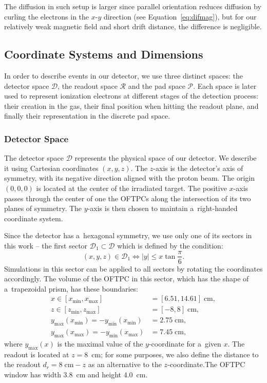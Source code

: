 			The diffusion in such setup is larger since parallel orientation reduces diffusion by curling the electrons in the $x$\nobreakdash-$y$ direction (see Equation~\ref{eq:difmag}), but for our relatively weak magnetic field and short drift distance, the difference is negligible.
	
		\subsection{Coordinate Systems and Dimensions}
		\label{sec:coor}
			In order to describe events in our detector, we use three distinct spaces: the detector space $\mathcal{D}$, the readout space $\mathcal{R}$ and the pad space $\mathcal{P}$. Each space is later used to represent ionization electrons at different stages of the detection process: their creation in the gas, their final position when hitting the readout plane, and finally their representation in the discrete pad space.
		
			\subsubsection{Detector Space}
				The detector space $\mathcal{D}$ represents the physical space of our detector. We describe it using Cartesian coordinates $(x,y,z)$. The $z$-axis is the detector's axis of symmetry, with its negative direction aligned with the proton beam. The origin $(0,0,0)$ is located at the center of the irradiated target. The positive $x$\nobreakdash-axis passes through the center of one the \acp{OFTPC} along the intersection of its two planes of symmetry. The $y$\nobreakdash-axis is then chosen to maintain a~right-handed coordinate system.
				
				Since the detector has a~hexagonal symmetry, we use only one of its sectors in this work -- the first sector $\mathcal{D}_1 \subset \mathcal{D}$ which is defined by the condition:
					\begin{equation}
						(x,y,z) \in \mathcal{D}_1 \Leftrightarrow |y| \leq x\tan \frac{\pi}{6}.
					\end{equation}
				Simulations in this sector can be applied to all sectors by rotating the coordinates accordingly. The volume of the \ac{OFTPC} in this sector, which has the shape of a~trapezoidal prism, has these boundaries:
					\begin{align}
						x \in [x_\text{min},x_\text{max}] &= [6.51, 14.61] \;\text{cm},\\
						z \in [z_\text{min},z_\text{max}] &= [-8,8] \;\text{cm},\\
						y_\text{max}(x_\text{min}) = -y_\text{min}(x_\text{min}) &=  2.75\;\text{cm},\\
						y_\text{max}(x_\text{max}) = -y_\text{min}(x_\text{max}) &=  7.45\;\text{cm},
					\end{align}
				where $y_\text{max}(x)$ is the maximal value of the $y$-coordinate for a~given $x$. The readout is located at $z = 8$~cm; for some purposes, we also define the distance to the readout $d_r = 8\;\text{cm}-z$ as an alternative to the $z$-coordinate.The \ac{OFTPC} window has width 3.8~cm and height 4.0~cm.
				
